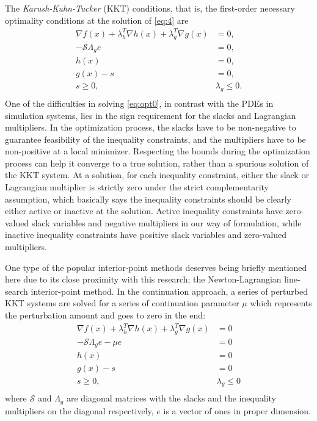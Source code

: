 \documentclass{article}
\theoremstyle{definition}
\begin{document}
The \textit{Karush-Kuhn-Tucker} (KKT) conditions, that is, the first-order necessary optimality conditions at the solution of \eqref{eq:4} are
\begin{equation}\label{eq:opt0}
\begin{aligned}
\nabla f(x) + \lambda_h^T \nabla h(x) + \lambda_g^T \nabla g(x) &= 0, \\
-\mathcal{S} \Lambda_g e &= 0,\\
h(x) &= 0, \\
g(x) - s &= 0, \\
s \geq 0, \quad &\lambda_g \leq 0. \\
\end{aligned}
\end{equation}
One of the difficulties in solving \eqref{eq:opt0}, in contrast with the PDEs in simulation systems, lies in the sign requirement for the slacks and Lagrangian multipliers. In the optimization process, the slacks have to be non-negative to guarantee feasibility of the inequality constraints, and the multipliers have to be non-positive at a local minimizer. Respecting the bounds during the optimization process can help it converge to a true solution, rather than a spurious solution of the KKT system. At a solution, for each inequality constraint, either the slack or Lagrangian multiplier is strictly zero under the strict complementarity assumption, which basically says the inequality constraints should be clearly either active or inactive at the solution. Active inequality constraints have zero-valued slack variables and negative multipliers in our way of formulation, while inactive inequality constraints have positive slack variables and zero-valued multipliers.

One type of the popular interior-point methods \cite{Nocedal2006NO} deserves being briefly mentioned here due to its close proximity with this research; the Newton-Lagrangian line-search interior-point method. In the continuation approach, a series of perturbed KKT systems are solved for a series of continuation parameter $\mu$ which represents the perturbation amount and goes to zero in the end:  
\begin{equation}\label{eq:kkt1}
\begin{aligned}
\nabla f(x) + \lambda_h^T \nabla h(x) + \lambda_g^T \nabla g(x) &= 0 \\
-\mathcal{S} \Lambda_g e - \mu e &= 0\\
h(x) &= 0 \\
g(x) - s &= 0 \\
s \geq 0, \quad &\lambda_g \leq 0 \\
\end{aligned}
\end{equation}
where $\mathcal{S}$ and $\Lambda_g$ are diagonal matrices with the slacks and the inequality multipliers on the diagonal respectively, $e$ is a vector of ones in proper dimension. 
\end{document}
